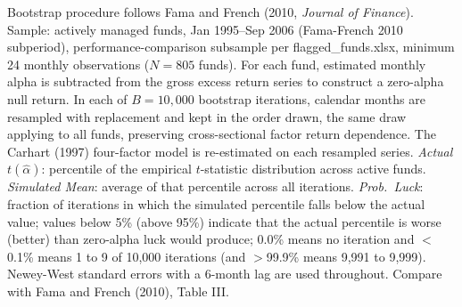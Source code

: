 \begin{table}[!htbp]
\centering
{}
\setlength{\tabletempwidth}{\wd\tabletempbox}
\ifdim\tabletempwidth>\linewidth\setlength{\tabletempwidth}{\linewidth}\fi
\begin{minipage}{\tabletempwidth}
\captionsetup{width=\linewidth}
\caption{\label{tab:bootstrap_tails_FF}Fama--French (2010) Bootstrap: Actual vs.\ Simulated $t(\hat{\alpha})$ Percentiles -- FF Subperiod}
\ifdim\wd\tabletempbox>\linewidth
  \resizebox{\linewidth}{!}{\usebox{\tabletempbox}}
\else
  \usebox{\tabletempbox}
\fi
\par\medskip
\begin{singlespace}\footnotesize\noindent
Bootstrap procedure follows Fama and French (2010, \textit{Journal of Finance}). Sample: actively managed funds, Jan 1995--Sep 2006 (Fama-French 2010 subperiod), performance-comparison subsample per flagged\_funds.xlsx, minimum 24 monthly observations ($N = 805$ funds). For each fund, estimated monthly alpha is subtracted from the gross excess return series to construct a zero-alpha null return. In each of $B = 10{,}000$ bootstrap iterations, calendar months are resampled with replacement and kept in the order drawn, the same draw applying to all funds, preserving cross-sectional factor return dependence. The Carhart (1997) four-factor model is re-estimated on each resampled series. \textit{Actual} $t(\hat{\alpha})$: percentile of the empirical $t$-statistic distribution across active funds. \textit{Simulated Mean}: average of that percentile across all iterations. \textit{Prob.\ Luck}: fraction of iterations in which the simulated percentile falls below the actual value; values below 5\% (above 95\%) indicate that the actual percentile is worse (better) than zero-alpha luck would produce; 0.0\% means no iteration and $<$0.1\% means 1 to 9 of 10,000 iterations (and $>$99.9\% means 9,991 to 9,999). Newey-West standard errors with a 6-month lag are used throughout. Compare with Fama and French (2010), Table III.
\end{singlespace}
\end{minipage}
\end{table}


